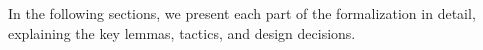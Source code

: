 In the following sections, we present each part of the formalization in detail, explaining the key lemmas, tactics, and design decisions.


